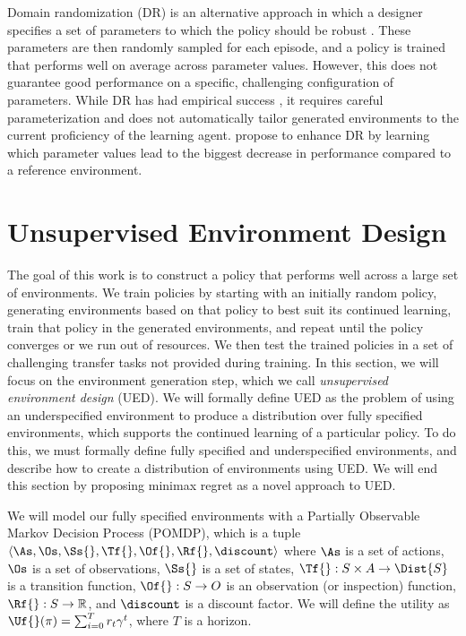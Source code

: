 \documentclass{article}
\begin{document}
Domain randomization (DR) \citep{jakobi1997evolutionary} is an alternative approach in which a designer specifies a set of parameters to which the policy should be robust \citep{sadeghi2016cad2rl,tobin2017domain,tan2018sim}. These parameters are then randomly sampled for each episode, and a policy is trained that performs well on average across parameter values. However, this does not guarantee good performance on a specific, challenging configuration of parameters. While DR has had empirical success \citep{andrychowicz2020learning}, it requires careful parameterization and does not automatically tailor generated environments to the current proficiency of the learning agent. \citet{mehta2020active} propose to enhance DR by learning which parameter values lead to the biggest decrease in performance compared to a reference environment.


\section{Unsupervised Environment Design}
\label{formalisms}

The goal of this work is to construct a policy that performs well across a large set of environments. We train policies by starting with an initially random policy, generating environments based on that policy to best suit its continued learning, train that policy in the generated environments, and repeat until the policy converges or we run out of resources. We then test the trained policies in a set of challenging transfer tasks not provided during training.  In this section, we will focus on the environment generation step, which we call \emph{unsupervised environment design} (UED).  We will formally define UED as the problem of using an underspecified environment
to produce a distribution over fully specified environments, which supports the continued learning of a particular policy.  
To do this, we must formally define fully specified and underspecified environments, and describe how to create a distribution of environments using UED. We will end this section by proposing minimax regret as a novel approach to UED.

We will model our fully specified environments with a Partially Observable Markov Decision Process (POMDP), which is a tuple $\langle \As,\Os,\Ss{}, \Tf{},\Of{},\Rf{},\discount \rangle$ where $\As$ is a set of actions, $\Os$ is a set of observations, $\Ss{}$ is a set of states, $\Tf{}: S \times A \rightarrow \Dist{S}$ is a transition function, $\Of{}: S \rightarrow O$ is an observation (or inspection) function, $\Rf{}: S \rightarrow \mathbb{R}$, and $\discount$ is a discount factor.  We will define the utility as $\Uf{}(\pi) = \sum_{i=0}^{T} r_t\gamma^t$, where $T$ is a horizon.
\end{document}
